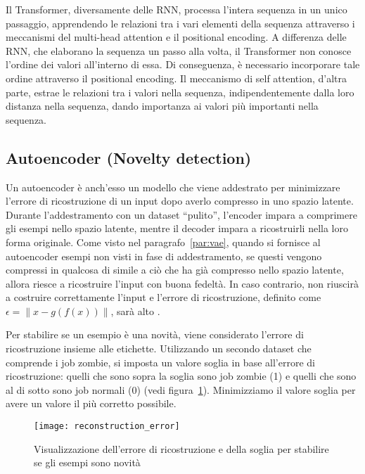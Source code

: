 Il Transformer, diversamente delle RNN, processa l'intera sequenza in un unico
passaggio, apprendendo le relazioni tra i vari elementi della sequenza
attraverso i meccanismi del multi-head attention e il positional encoding. A
differenza delle RNN, che elaborano la sequenza un passo alla volta, il
Transformer non conosce l'ordine dei valori all'interno di essa. Di
conseguenza, è necessario incorporare tale ordine attraverso il positional
encoding. Il meccanismo di self attention, d'altra parte, estrae le relazioni
tra i valori nella sequenza, indipendentemente dalla loro distanza nella
sequenza, dando importanza ai valori più importanti nella sequenza.

\subsection{Autoencoder (Novelty detection)}

Un autoencoder è anch'esso un modello che viene addestrato per minimizzare
l'errore di ricostruzione di un input dopo averlo compresso in uno spazio
latente. Durante l'addestramento con un dataset ``pulito'', l'encoder impara a
comprimere gli esempi nello spazio latente, mentre il decoder impara a
ricostruirli nella loro forma originale. Come visto nel
paragrafo~\ref{par:vae}, quando si fornisce al autoencoder esempi non visti in
fase di addestramento, se questi vengono compressi in qualcosa di simile a ciò
che ha già compresso nello spazio latente, allora riesce a ricostruire l'input
con buona fedeltà. In caso contrario, non riuscirà a costruire correttamente
l'input e l'errore di ricostruzione, definito come $\epsilon=\lVert
x-g(f(x))\rVert$, sarà alto \cite{borghesi2019}.

Per stabilire se un esempio è una novità, viene considerato l'errore di
ricostruzione insieme alle etichette. Utilizzando un secondo dataset che
comprende i job zombie, si imposta un valore soglia in base all'errore di
ricostruzione: quelli che sono sopra la soglia sono job zombie (1) e quelli
che sono al di sotto sono job normali (0) (vedi
figura~\ref{fig:reconstruction_error}). Minimizziamo il valore soglia per
avere un valore il più corretto possibile.

\begin{figure}[!ht]
    \centering
    \texttt{[image: reconstruction\_error]}
    \caption{Visualizzazione dell'errore di ricostruzione e della soglia per
    stabilire se gli esempi sono novità}
    \label{fig:reconstruction_error}
\end{figure}

